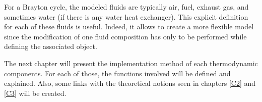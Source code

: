 For a Brayton cycle, the modeled fluids are typically air, fuel, exhaust gas, and sometimes water (if there is any water heat exchanger). This explicit definition for each of these fluids is useful. Indeed, it allows to create a more flexible model since the modification of one fluid composition has only to be performed while defining the associated object. 

The next chapter will present the implementation method of each thermodynamic components. For each of those, the functions involved will be defined and explained. Also, some links with the theoretical notions seen in chapters \ref{C2} and \ref{C3} will be created.





 